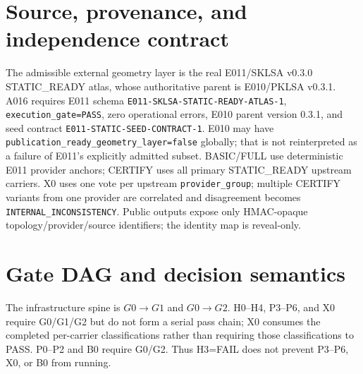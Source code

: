 \documentclass[11pt,a4paper]{article}
\begin{document}
\section{Source, provenance, and independence contract}
The admissible external geometry layer is the real E011/SKLSA v0.3.0 STATIC\_READY atlas, whose authoritative parent is E010/PKLSA v0.3.1. A016 requires E011 schema \texttt{E011-SKLSA-STATIC-READY-ATLAS-1}, \texttt{execution\_gate=PASS}, zero operational errors, E010 parent version 0.3.1, and seed contract \texttt{E011-STATIC-SEED-CONTRACT-1}. E010 may have \texttt{publication\_ready\_geometry\_layer=false} globally; that is not reinterpreted as a failure of E011's explicitly admitted subset. BASIC/FULL use deterministic E011 provider anchors; CERTIFY uses all primary STATIC\_READY upstream carriers. X0 uses one vote per upstream \texttt{provider\_group}; multiple CERTIFY variants from one provider are correlated and disagreement becomes \texttt{INTERNAL\_INCONSISTENCY}. Public outputs expose only HMAC-opaque topology/provider/source identifiers; the identity map is reveal-only.

\section{Gate DAG and decision semantics}
The infrastructure spine is $G0\rightarrow G1$ and $G0\rightarrow G2$. H0--H4, P3--P6, and X0 require G0/G1/G2 but do not form a serial pass chain; X0 consumes the completed per-carrier classifications rather than requiring those classifications to PASS. P0--P2 and B0 require G0/G2. Thus H3=FAIL does not prevent P3--P6, X0, or B0 from running.
\end{document}
